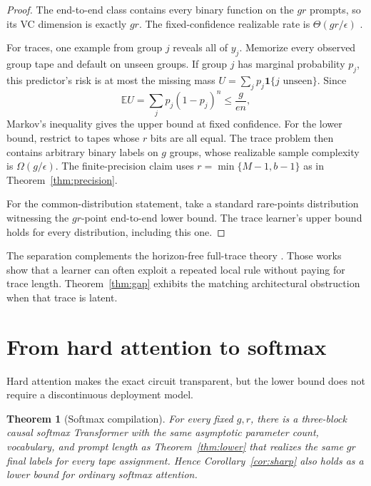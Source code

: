 \documentclass{article}
\newtheorem{theorem}{Theorem}
\newcommand{\E}{\mathbb E}
\newcommand{\1}{\mathbf 1}
\begin{document}
\begin{proof}
The end-to-end class contains every binary function on the $gr$ prompts, so its VC dimension is
exactly $gr$. The fixed-confidence realizable rate is $\Theta(gr/\epsilon)$
\citep{hanneke2016optimal}.

For traces, one example from group $j$ reveals all of $y_j$. Memorize every observed group tape
and default on unseen groups. If group $j$ has marginal probability $p_j$, this predictor's risk is
at most the missing mass $U=\sum_jp_j\1\{j\text{ unseen}\}$. Since
\[
 \E U=\sum_jp_j(1-p_j)^n\leq \frac{g}{e n},
\]
Markov's inequality gives the upper bound at fixed confidence. For the lower bound, restrict to
tapes whose $r$ bits are all equal. The trace problem then contains arbitrary binary labels on $g$
groups, whose realizable sample complexity is $\Omega(g/\epsilon)$. The finite-precision claim
uses $r=\min\{M-1,b-1\}$ as in Theorem~\ref{thm:precision}.

For the common-distribution statement, take a standard rare-points distribution witnessing the
$gr$-point end-to-end lower bound. The trace learner's upper bound holds for every distribution,
including this one.
\end{proof}

The separation complements the horizon-free full-trace theory
\citep{joshi2025theory,hanneke2026sample,li2026optimal,yang2026tight}. Those works show that a
learner can often exploit a repeated local rule without paying for trace length. Theorem~\ref{thm:gap}
exhibits the matching architectural obstruction when that trace is latent.

\section{From hard attention to softmax}

Hard attention makes the exact circuit transparent, but the lower bound does not require a
discontinuous deployment model.

\begin{theorem}[Softmax compilation]\label{thm:softmax}
For every fixed $g,r$, there is a three-block causal softmax Transformer with the same asymptotic
parameter count, vocabulary, and prompt length as Theorem~\ref{thm:lower} that realizes the same
$gr$ final labels for every tape assignment. Hence Corollary~\ref{cor:sharp} also holds as a lower
bound for ordinary softmax attention.
\end{theorem}
\end{document}
